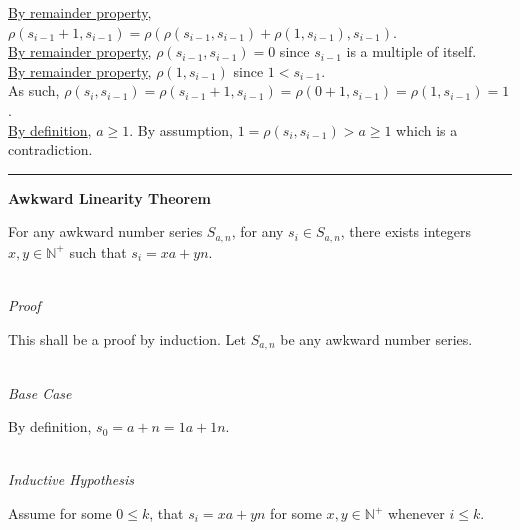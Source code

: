 \documentclass[a4paper,12pt]{article}
\begin{document}
\noindent \hyperlink{remainder_properties}{By remainder property}, $\rho(s_{i - 1} + 1, s_{i - 1}) = \rho(\rho(s_{i - 1}, s_{i - 1}) + \rho(1, s_{i - 1}), s_{i - 1})$.\\

\noindent \hyperlink{remainder_properties}{By remainder property}, $\rho(s_{i - 1}, s_{i - 1}) = 0$ since $s_{i - 1}$ is a multiple of itself.\\

\noindent \hyperlink{remainder_properties}{By remainder property}, $\rho(1, s_{i - 1})$ since $1 < s_{i - 1}$.\\

\noindent As such, $\rho(s_i, s_{i - 1}) = \rho(s_{i - 1} + 1, s_{i - 1}) = \rho(0 + 1, s_{i - 1}) = \rho(1, s_{i - 1}) = 1$.\\

\noindent \hyperlink{definition:awkward_number_series}{By definition}, $a \geq 1$. By assumption, $1 = \rho(s_i, s_{i - 1}) > a \geq 1$ which is a contradiction.


\begin{center}
\noindent\rule{8cm}{0.4pt}
\end{center}









\label{theorem:awkward_linearity}
\hypertarget{theorem:awkward_linearity}{}
\begin{tcolorbox}
\textbf{Awkward Linearity Theorem}

For any awkward number series $S_{a,n}$, for any $s_i \in S_{a,n}$, there exists integers $x, y \in \mathbb{N}^+$ such that $s_i = xa + yn$.

\end{tcolorbox}

\noindent \\
\textit{Proof}

\noindent This shall be a proof by induction. Let $S_{a,n}$ be any awkward number series.


\noindent \\
\textit{Base Case}

\noindent By definition, $s_0 = a + n = 1a + 1n$.


\noindent \\
\textit{Inductive Hypothesis}

\noindent Assume for some $0 \leq k$, that $s_i = xa + yn$ for some $x, y \in \mathbb{N}^+$ whenever $i \leq k$.
\end{document}
